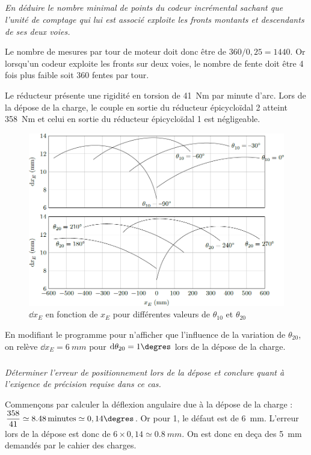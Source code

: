 \documentclass[10pt,fleqn]{article} %
\begin{document}
\subparagraph{\label{q}}\textit{En déduire le nombre minimal de points du codeur incrémental sachant que l’unité de comptage qui lui est associé exploite les fronts montants et descendants de ses deux voies.}
\ifprof
\begin{corrige}
Le nombre de mesures par tour de moteur doit donc être de $360/0,25 = 1440$. Or lorsqu'un codeur exploite les fronts sur deux voies, le nombre de fente doit être 4 fois plus faible soit 360 fentes par tour.
\end{corrige}
\else
\fi

\ifprof
\else

Le réducteur présente une rigidité en torsion de \SI{41}{Nm} par minute d’arc. Lors de la dépose de la charge, le couple en sortie du réducteur épicycloïdal 2 atteint \SI{358}{Nm} et celui en sortie du réducteur épicycloïdal 1 est négligeable.

\begin{figure}[H]
\centering
\includegraphics[width=0.8\linewidth]{fig_07}
\caption{ $\dd x_E$ en fonction de $x_E$ pour différentes valeurs de $\theta_{10}$ et $\theta_{20}$ \label{fig_07}}
\end{figure}


En modifiant le programme pour n’afficher que l’influence de la variation de $\theta_{20}$, on relève $\dd x_E  = \SI{6}{mm}$ pour $\dd \theta_{20} = 1\degres$ lors de la dépose de la charge.
\fi


\subparagraph{\label{q}}\textit{Déterminer l’erreur de positionnement lors de la dépose et conclure quant à l’exigence de précision requise dans ce cas.}
\ifprof
\begin{corrige}
Commençons par calculer la déflexion angulaire due à la dépose de la charge  : $\dfrac{358}{41}\simeq \SI{8,48}{minutes} \simeq 0,14\degres $.  Or pour 1\degres, le défaut est de \SI{6}{mm}. L'erreur lors de la dépose est donc de $6\times 0,14 \simeq \SI{0,8}{mm}$. On est donc en deça des \SI{5}{mm} demandés par le cahier des charges.
\end{corrige}
\else
\fi
\end{document}
